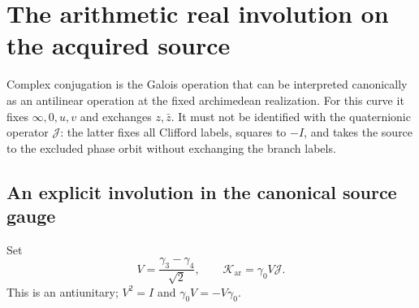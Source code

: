 \documentclass[11pt]{article}
\theoremstyle{definition}
\theoremstyle{remark}
\newcommand{\Jq}{\mathcal J}
\begin{document}
\section{The arithmetic real involution on the acquired source}
\label{sec:v4-real-descent}

Complex conjugation is the Galois operation that can be interpreted
canonically as an antilinear operation at the fixed archimedean realization.
For this curve it fixes $\infty,0,u,v$ and exchanges $z,\bar z$.
It must not be identified with the quaternionic operator $\Jq$: the latter
fixes all Clifford labels, squares to $-I$, and takes the source to the
excluded phase orbit without exchanging the branch labels.

\subsection{An explicit involution in the canonical source gauge}
Set
\begin{equation}
 V=\frac{\gamma_3-\gamma_4}{\sqrt2},\qquad
 \mathcal K_{\mathrm{ar}}=\gamma_0V\Jq.
 \label{eq:v4-Kar}
\end{equation}
This is an antiunitary; $V^2=I$ and $\gamma_0V=-V\gamma_0$.
\end{document}
